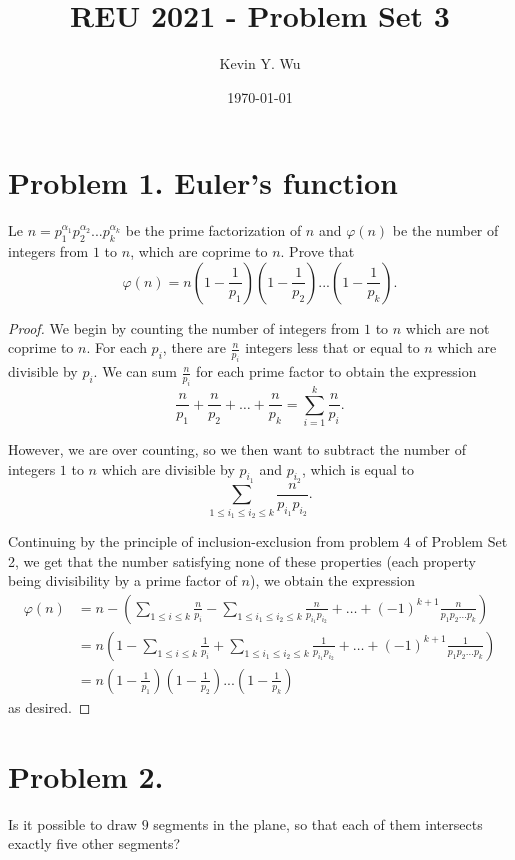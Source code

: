 \documentclass{article}
\title{REU 2021 - Problem Set 3}
\author{Kevin Y. Wu}
\date{\today}
\begin{document}
\maketitle

\tableofcontents
\newpage
{}


\section{Problem 1. Euler's function}
Le $n=p_1^{\alpha_1}p_2^{\alpha_2}...p_k^{\alpha_k}$ be the prime factorization of $n$ and $\varphi(n)$ be the number of integers from $1$ to $n$, which are coprime to $n$. Prove that
\[\varphi(n)=n\left (1-\frac{1}{p_1}\right )\left (1-\frac{1}{p_2}\right )...\left (1-\frac{1}{p_k}\right ).\]
\begin{proof}
We begin by counting the number of integers from $1$ to $n$ which are not coprime to $n$. For each $p_i$, there are $\frac{n}{p_i}$ integers less that or equal to $n$ which are divisible by $p_i$. We can sum $\frac{n}{p_i}$ for each prime factor to obtain the expression
\[\frac{n}{p_1}+\frac{n}{p_2}+\dots+\frac{n}{p_k}=\sum_{i=1}^k\frac{n}{p_i}.\]
\par However, we are over counting, so we then want to subtract the number of integers $1$ to $n$ which are divisible by $p_{i_1}$ and $p_{i_2}$, which is equal to
\[\sum_{1\leq i_1\leq i_2\leq k}\frac{n}{p_{i_1}p_{i_2}}.\]
\par Continuing by the principle of inclusion-exclusion from problem 4 of Problem Set 2, we get that the number satisfying none of these properties (each property being divisibility by a prime factor of $n$), we obtain the expression
\begin{align*}
    \varphi(n)&=n-\left (\sum_{1\leq i\leq k} \frac{n}{p_i}-\sum_{1\leq i_1\leq i_2\leq k}\frac{n}{p_{i_1}p_{i_2}}+\dots +(-1)^{k+1}\frac{n}{p_1p_2\dots p_k}\right )\\
    &=n\left (1-\sum_{1\leq i\leq k} \frac{1}{p_i}+\sum_{1\leq i_1\leq i_2\leq k}\frac{1}{p_{i_1}p_{i_2}}+\dots +(-1)^{k+1}\frac{1}{p_1p_2\dots p_k}\right )\\
    &=n\left (1-\frac{1}{p_1}\right )\left (1-\frac{1}{p_2}\right )...\left (1-\frac{1}{p_k}\right )
\end{align*}
as desired.
\end{proof}


\section{Problem 2.}
Is it possible to draw $9$ segments in the plane, so that each of them intersects exactly five other segments?
\end{document}
